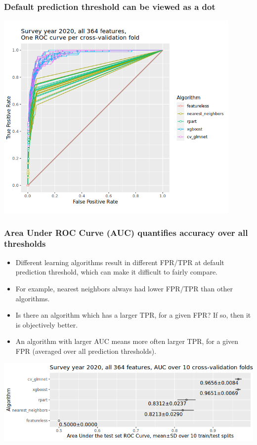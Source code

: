 \documentclass{beamer}
\begin{document}
\begin{frame}
  \frametitle{Default prediction threshold can be viewed as a dot}
  \includegraphics[width=0.9\textwidth]{download-nsch-mlr3batchmark-registry-one-set-all-features-roc-point.png}
\end{frame}

\begin{frame}
  \frametitle{Area Under ROC Curve (AUC) quantifies accuracy over all thresholds}
  \begin{itemize}
  \item Different learning algorithms result in different FPR/TPR at
    default prediction threshold, which can make it difficult to
    fairly compare.
  \item For example, nearest neighbors always had lower FPR/TPR than other
    algorithms.
  \item Is there an algorithm which has a larger TPR, for a given FPR?
    If so, then it is objectively better.
  \item An algorithm with larger AUC means more often larger TPR, for
    a given FPR (averaged over all prediction thresholds).
  \end{itemize}
  \includegraphics[width=\textwidth]{download-nsch-mlr3batchmark-registry-one-set-all-features-auc.png}
\end{frame}
\end{document}
